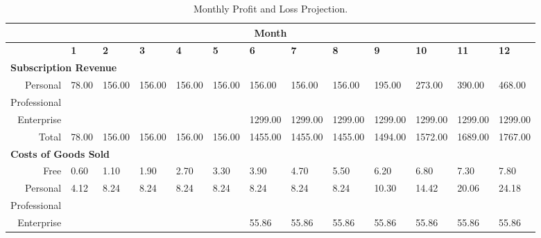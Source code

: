 \begin{table}[H]
  \caption{Monthly Profit and Loss Projection.}
  \setlength\tabcolsep{2pt}
  \def\arraystretch{1.2}%
  \scriptsize

  \begin{tabularx}{\textwidth}{X X X X X X X X X X X X X}

    \multicolumn{13}{c}{\textbf{Month}} \\

    \hline
    
    \multicolumn{1}{c}{} & \textbf{1} & \textbf{2} & \textbf{3} & \textbf{4} & \textbf{5} & \textbf{6} & \textbf{7} & \textbf{8} & \textbf{9} & \textbf{10} & \textbf{11} & \textbf{12}  \\

    \hline

    \multicolumn{13}{l}{\textbf{Subscription Revenue}} \\

    \hline

    \multicolumn{1}{r}{Personal} & 78.00 & 156.00 & 156.00 & 156.00  & 156.00  & 156.00  & 156.00  & 156.00  & 195.00  & 273.00  & 390.00  & 468.00  \\
    \multicolumn{1}{r}{Professional} &   &   &  &   &  &  &  &  &  &  &  &  \\
    \multicolumn{1}{r}{Enterprise} &  &  &  &  &  & 1299.00 & 1299.00 & 1299.00 & 1299.00 & 1299.00 & 1299.00 & 1299.00  \\

    \multicolumn{1}{r}{Total} & 78.00 & 156.00 & 156.00 & 156.00  & 156.00  & 1455.00  & 1455.00  & 1455.00  & 1494.00  & 1572.00  & 1689.00  & 1767.00  \\

    \hline

    \multicolumn{13}{l}{\textbf{Costs of Goods Sold}} \\

    \hline

    \multicolumn{1}{r}{Free} & 0.60 & 1.10  & 1.90 & 2.70 & 3.30 & 3.90 & 4.70 & 5.50 & 6.20 & 6.80 & 7.30 & 7.80  \\
    \multicolumn{1}{r}{Personal} & 4.12 & 8.24 & 8.24 & 8.24 & 8.24 & 8.24 & 8.24 & 8.24 & 10.30  & 14.42 & 20.06 & 24.18  \\
    \multicolumn{1}{r}{Professional} &  &  &  &  &  &  &  &  &  &  &  &   \\
    \multicolumn{1}{r}{Enterprise} &  &  &  &  &  & 55.86 & 55.86 & 55.86 & 55.86 & 55.86 & 55.86 & 55.86  \\


\end{tabularx}
\end{table}
